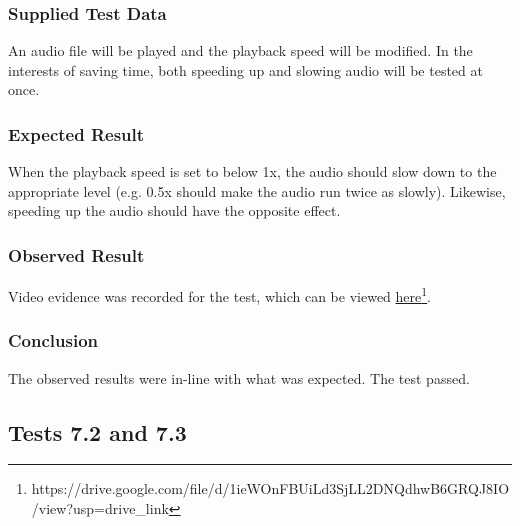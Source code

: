 \paragraph{}
{
	\centering
}
\paragraph{}
{
	\centering
}

\subsubsection*{Supplied Test Data}
An audio file will be played and the playback speed will be modified. In the interests of saving time, both speeding up and slowing audio will be tested at once.

\subsubsection*{Expected Result}
When the playback speed is set to below 1x, the audio should slow down to the appropriate level (e.g. 0.5x should make the audio run twice as slowly). Likewise, speeding up the audio should have the opposite effect.

\subsubsection*{Observed Result}
\label{sec:evidence7.1}
Video evidence was recorded for the test, which can be viewed \href{https://drive.google.com/file/d/1ieWOnFBUiLd3SjLL2DNQdhwB6GRQJ8IO/view?usp=drive_link}{here}\footnote{
	https://drive.google.com/file/d/1ieWOnFBUiLd3SjLL2DNQdhwB6GRQJ8IO/view?usp=drive\_link
}.

\subsubsection*{Conclusion}
The observed results were in-line with what was expected. The test passed.


\pagebreak
\subsection{Tests 7.2 and 7.3}
